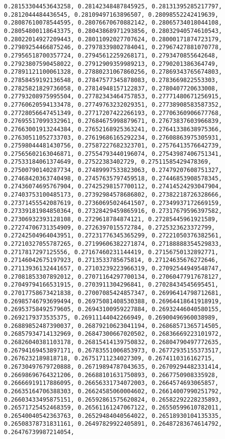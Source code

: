 \documentclass[11pt]{article}
\begin{document}
\begin{Verbatim}[commandchars=\\\{\}]
0.28153304453643258, 0.28142348487845925, 0.28131395285217797, 0.2812044484436545, 0.28109497163896507, 0.28098552242419639, 0.28087610078544595, 0.28076670670882142, 0.28065734018044108, 0.28054800118643375, 0.28043868971293856, 0.28032940574610543, 0.28022014927209443, 0.28011092027707624, 0.28000171874723179, 0.27989254466875246, 0.27978339802784041, 0.27967427881070778, 0.27956518700357724, 0.27945612259268171, 0.2793470855642648, 0.27923807590458022, 0.27912909359989213, 0.2790201386364749, 0.27891121100061328, 0.27880231067860256, 0.27869343765674803, 0.27858459192136548, 0.27847577345878083, 0.2783669822553303, 0.27825821829736058, 0.27814948157122837, 0.2780407720633008, 0.27793208975995504, 0.27782343464757853, 0.27771480671256915, 0.27760620594133478, 0.27749763232029351, 0.27738908583587352, 0.27728056647451349, 0.27717207422266193, 0.27706360906677768, 0.27695517099332961, 0.27684675998879671, 0.27673837603966839, 0.27663001913244384, 0.27652168925363241, 0.27641338638975366, 0.27630511052733703, 0.27619686165292234, 0.27608863975305931, 0.27598044481430756, 0.27587227682323701, 0.27576413576642739, 0.27565602163046871, 0.27554793440196074, 0.27543987406751341, 0.27533184061374649, 0.27522383402729, 0.27511585429478369, 0.27500790140287734, 0.27489997533823063, 0.27479207608751327, 0.27468420363740498, 0.27457635797459518, 0.27446853908578345, 0.27436074695767904, 0.27425298157700112, 0.27414524293047904, 0.27403753100485173, 0.27392984578686802, 0.27382218726328666, 0.27371455542087619, 0.27360695024641507, 0.27349937172669159, 0.27339181984850364, 0.27328429459865916, 0.27317679596397582, 0.27306932393128108, 0.2729618784874121, 0.27285445961921589, 0.27274706731354909, 0.2726397015572784, 0.2725323623372799, 0.27242504964043951, 0.27231776345365299, 0.27221050376382561, 0.27210327055787265, 0.27199606382271874, 0.27188888354529833, 0.2717817297125556, 0.27167460231144419, 0.27156750132892771, 0.27146042675197923, 0.2713533785675814, 0.27124635676272646, 0.27113936132441657, 0.27103239223966319, 0.27092544949548747, 0.27081853307892012, 0.27071164297700134, 0.27060477917678127, 0.27049794166531915, 0.2703911304296841, 0.27028434545695451, 0.27017758673421838, 0.27007085424857347, 0.26996414798712681, 0.26985746793699494, 0.26975081408530388, 0.26964418641918919, 0.26953758492579605, 0.26943100959227884, 0.26932446040580155, 0.2692179373535375, 0.26911144042266949, 0.26900496960038989, 0.26889852487390037, 0.26879210623041194, 0.26868571365714505, 0.26857934714132969, 0.26847300667020502, 0.26836669223101972, 0.26826040381103178, 0.26815414139750832, 0.26804790497772635, 0.26794169453897171, 0.26783551006853973, 0.26772935155373517, 0.2676232189818718, 0.26751711234027309, 0.2674110316162715, 0.26730497679720888, 0.26719894787043635, 0.26709294482331414, 0.26698696764321206, 0.26688101631750893, 0.2667750908335928, 0.26666919117886095, 0.26656331734072003, 0.2664574693065857, 0.26635164706388303, 0.26624585060004602, 0.26614007990251792, 0.26603433495875151, 0.26592861575620824, 0.26582292228235893, 0.26571725452468359, 0.26561161247067122, 0.26550599610782011, 0.26540040542363763, 0.26529484040564022, 0.26518930104135335, 0.26508378731831161, 0.26497829922405891, 0.26487283674614792, 0.26476739987214054, 
\end{Verbatim}
\end{document}
